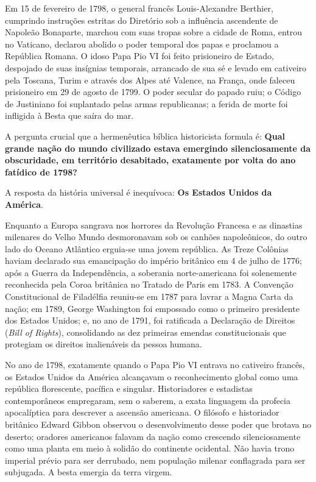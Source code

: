 Em 15 de fevereiro de 1798, o general francês Louis-Alexandre Berthier, cumprindo instruções estritas do Diretório sob a influência ascendente de Napoleão Bonaparte, marchou com suas tropas sobre a cidade de Roma, entrou no Vaticano, declarou abolido o poder temporal dos papas e proclamou a República Romana. O idoso Papa Pio VI foi feito prisioneiro de Estado, despojado de suas insígnias temporais, arrancado de sua sé e levado em cativeiro pela Toscana, Turim e através dos Alpes até Valence, na França, onde faleceu prisioneiro em 29 de agosto de 1799. O poder secular do papado ruiu; o Código de Justiniano foi suplantado pelas armas republicanas; a ferida de morte foi infligida à Besta que saíra do mar.

A pergunta crucial que a hermenêutica bíblica historicista formula é: \textbf{Qual grande nação do mundo civilizado estava emergindo silenciosamente da obscuridade, em território desabitado, exatamente por volta do ano fatídico de 1798?}

A resposta da história universal é inequívoca: \textbf{Os Estados Unidos da América}.

Enquanto a Europa sangrava nos horrores da Revolução Francesa e as dinastias milenares do Velho Mundo desmoronavam sob os canhões napoleônicos, do outro lado do Oceano Atlântico erguia-se uma jovem república. As Treze Colônias haviam declarado sua emancipação do império britânico em 4 de julho de 1776; após a Guerra da Independência, a soberania norte-americana foi solenemente reconhecida pela Coroa britânica no Tratado de Paris em 1783. A Convenção Constitucional de Filadélfia reuniu-se em 1787 para lavrar a Magna Carta da nação; em 1789, George Washington foi empossado como o primeiro presidente dos Estados Unidos; e, no ano de 1791, foi ratificada a Declaração de Direitos (\textit{Bill of Rights}), consolidando as dez primeiras emendas constitucionais que protegiam os direitos inalienáveis da pessoa humana.

No ano de 1798, exatamente quando o Papa Pio VI entrava no cativeiro francês, os Estados Unidos da América alcançavam o reconhecimento global como uma república florescente, pacífica e singular. Historiadores e estadistas contemporâneos empregaram, sem o saberem, a exata linguagem da profecia apocalíptica para descrever a ascensão americana. O filósofo e historiador britânico Edward Gibbon observou o desenvolvimento desse poder que brotava no deserto; oradores americanos falavam da nação como crescendo silenciosamente como uma planta em meio à solidão do continente ocidental. Não havia trono imperial prévio para ser derrubado, nem população milenar conflagrada para ser subjugada. A besta emergia da terra virgem.



